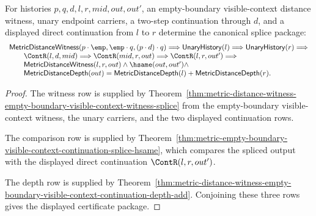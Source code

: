 \begin{theorem}
\label{thm:metric-empty-boundary-visible-context-canonical-splice-package}
For histories $p,q,d,l,r,mid,out,out'$, an empty-boundary visible-context
distance witness, unary endpoint carriers, a two-step continuation through
$d$, and a displayed direct continuation from $l$ to $r$ determine the
canonical splice package:
$$
\begin{array}{l}
\mathsf{MetricDistanceWitness}(p\cdot\emp,\emp\cdot q,(p\cdot d)\cdot q)
\Longrightarrow
\mathsf{UnaryHistory}(l)\Longrightarrow\mathsf{UnaryHistory}(r)\Longrightarrow\\
\qquad
\ContR(l,d,mid)\Longrightarrow\ContR(mid,r,out)\Longrightarrow
\ContR(l,r,out')\Longrightarrow\\
\qquad
\mathsf{MetricDistanceWitness}(l,r,out)\land
\hsame(out,out')\land\\
\qquad
\mathsf{MetricDistanceDepth}(out)=
\mathsf{MetricDistanceDepth}(l)+\mathsf{MetricDistanceDepth}(r).
\end{array}
$$
\end{theorem}
\begin{proof}
The witness row is supplied by
Theorem~\ref{thm:metric-distance-witness-empty-boundary-visible-context-witness-splice}
from the empty-boundary visible-context witness, the unary carriers, and the
two displayed continuation rows.

The comparison row is supplied by
Theorem~\ref{thm:metric-empty-boundary-visible-context-continuation-splice-hsame},
which compares the spliced output with the displayed direct continuation
$\ContR(l,r,out')$.

The depth row is supplied by
Theorem~\ref{thm:metric-distance-witness-empty-boundary-visible-context-continuation-depth-add}.
Conjoining these three rows gives the displayed certificate package.
\end{proof}

